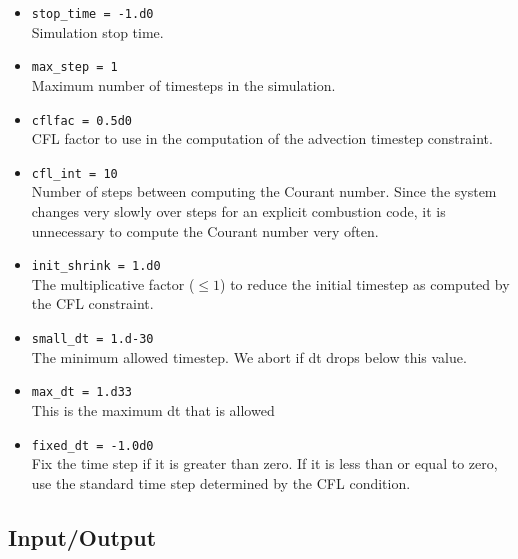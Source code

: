 \documentclass[11pt,letterpaper]{article}
\begin{document}
\begin{itemize}
\item {\tt stop\_time = -1.d0}\\
  Simulation stop time.
\item {\tt max\_step = 1}\\
  Maximum number of timesteps in the simulation.
\item {\tt cflfac = 0.5d0}\\
  CFL factor to use in the computation of the advection timestep
  constraint. 
\item {\tt cfl\_int = 10}\\
  Number of steps between computing the Courant number.  Since the
  system changes very slowly over steps for an explicit combustion
  code, it is unnecessary to compute the Courant number very often. 
\item {\tt init\_shrink = 1.d0}\\
  The multiplicative factor ($\le 1$) to reduce the initial timestep
  as computed by the CFL constraint.
\item {\tt small\_dt = 1.d-30}\\
  The minimum allowed timestep.  We abort if dt drops below this
  value. 
\item {\tt max\_dt = 1.d33}\\
  This is the maximum dt that is allowed
\item {\tt fixed\_dt = -1.0d0}\\
  Fix the time step if it is greater than zero.  If it is less than or
  equal to zero, use the standard time step determined by the CFL
  condition.
\end{itemize}

\subsection{Input/Output}
\end{document}
